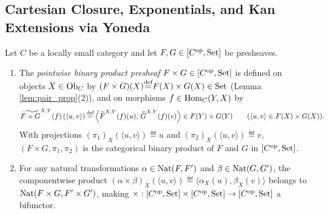 \documentclass[10pt,a4paper]{article}
\begin{document}
\subsection{Cartesian Closure, Exponentials, and Kan Extensions via Yoneda}\label{sec:ccc_kan}

\begin{lemma}\label{lem:presheaf_product}
Let $C$ be a locally small category and let $F, G \in [C^{\textrm{op}}, {\textrm{Set}}]$ be presheaves.
\begin{enumerate}
\item The \emph{pointwise binary product presheaf} $F \times G \in [C^{\textrm{op}}, {\textrm{Set}}]$ is defined on objects $X \in {\textrm{Ob}}_C$ by $(F \times G)(X) {\stackrel{{\textrm{def}}}{=}} F(X) \times G(X) \in {\textrm{Set}}$ (Lemma \ref{lem:pair_prop}(2)), and on morphisms $f \in {\textrm{Hom}}_C(Y, X)$ by
$$\widetilde{F \times G}^{X,Y}(f)\left(\langle u, v \rangle\right) {\stackrel{{\textrm{def}}}{=}} \left\langle {\widetilde{F}\textrm{}}^{X,Y}(f)(u),\, {\widetilde{G}\textrm{}}^{X,Y}(f)(v) \right\rangle \in F(Y) \times G(Y) \qquad (\langle u, v \rangle \in F(X) \times G(X)).$$
With projections $(\pi_1)_X(\langle u, v \rangle) \eqdef u$ and $(\pi_2)_X(\langle u, v \rangle) \eqdef v$, $(F \times G, \pi_1, \pi_2)$ is the categorical binary product of $F$ and $G$ in $[C^{\textrm{op}}, {\textrm{Set}}]$.
\item For any natural transformations $\alpha \in {\textrm{Nat}}(F, F')$ and $\beta \in {\textrm{Nat}}(G, G')$, the componentwise product $(\alpha \times \beta)_X(\langle u, v \rangle) \eqdef \langle \alpha_X(u), \beta_X(v) \rangle$ belongs to ${\textrm{Nat}}(F \times G, F' \times G')$, making $\times : [C^{\textrm{op}}, {\textrm{Set}}] \times [C^{\textrm{op}}, {\textrm{Set}}] \to [C^{\textrm{op}}, {\textrm{Set}}]$ a bifunctor.
\end{enumerate}
\end{lemma}
\myprf
\end{document}
